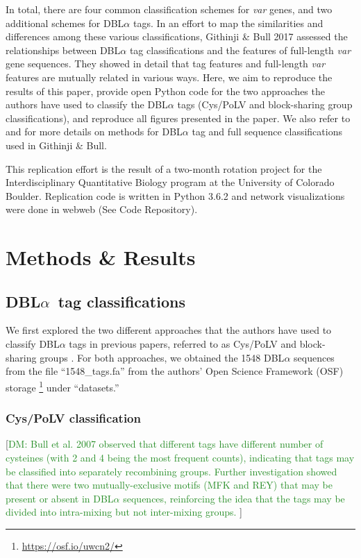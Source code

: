 \documentclass[10pt,twocolumn,superscriptaddress]{revtex4-1}
\newcommand{\dieumycom}[1]{[\textcolor{ForestGreen}{DM: #1}]}
\newcommand{\var}{{\it var}\xspace}
\newcommand{\dbla}{{DBL$\alpha$}\xspace}
\newcommand{\cp}{{Cys/PoLV}\xspace}
\newcommand{\paper}{{Githinji \& Bull}\xspace}
\begin{document}
In total, there are four common classification schemes for \var genes, and two additional schemes for \dbla tags. In an effort to map the similarities and differences among these various classifications, \paper 2017 \cite{githinji2017} assessed the relationships between \dbla tag classifications and the features of full-length \var gene sequences. They showed in detail that tag features and full-length \var features are mutually related in various ways. Here, we aim to reproduce the results of this paper, provide open Python code for the two approaches the authors have used to classify the \dbla tags (\cp and block-sharing group classifications), and reproduce all figures presented in the paper. We also refer to \cite{bull2008, bull2007} and \cite{rask2010} for more details on methods for \dbla tag and full sequence classifications used in \paper \cite{githinji2017}. 

This replication effort is the result of a two-month rotation project for the Interdisciplinary Quantitative Biology program at the University of Colorado Boulder. Replication code is written in Python 3.6.2 and network visualizations were done in webweb (See Code Repository).


\section{Methods \& Results}
\subsection{\dbla\ tag classifications}
We first explored the two different approaches that the authors have used to classify \dbla tags in previous papers, referred to as \cp \cite{bull2007} and block-sharing groups \cite{bull2008}. For both approaches, we obtained the 1548 \dbla sequences from the file ``1548\_tags.fa'' from the authors' Open Science Framework (OSF) storage \footnote{\url{https://osf.io/uwcn2/}} under ``datasets.''  

\subsubsection{\cp classification}
\dieumycom{Bull et al. 2007 observed that different tags have different number of cysteines (with 2 and 4 being the most frequent counts), indicating that tags may be classified into separately recombining groups. Further investigation showed that there were two mutually-exclusive motifs (MFK and REY) that may be present or absent in \dbla sequences, reinforcing the idea that the tags may be divided into intra-mixing but not inter-mixing groups.  \cite{bull2007}}
\end{document}
